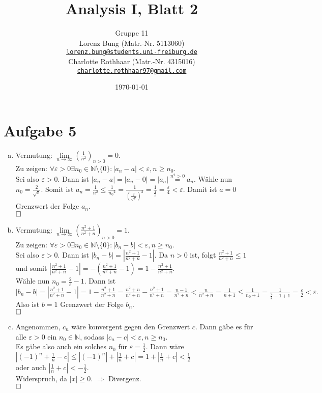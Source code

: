 \documentclass[12pt,a4paper]{article}
\title{Analysis I, Blatt 2}
\author{
    Gruppe 11\\
    Lorenz Bung (Matr.-Nr. 5113060)\\
    \href{mailto:lorenz.bung@students.uni-freiburg.de}{\texttt{lorenz.bung@students.uni-freiburg.de}}\\
    Charlotte Rothhaar (Matr.-Nr. 4315016)\\
    \href{mailto:charlotte.rothhaar97@gmail.com}{\texttt{charlotte.rothhaar97@gmail.com}}
}
\date{\today}
\newcommand{\qed}{\null\nobreak\hfill\square}
\begin{document}
\maketitle


\section*{Aufgabe 5}

\begin{enumerate}[(a)]
    \item Vermutung: $\lim\limits_{n \to \infty} \left(\frac{1}{n^2}\right)_{n > 0} = 0.$\\
    Zu zeigen: $\forall \varepsilon > 0 \exists n_0 \in \mathbb{N} \setminus \{0\} : |a_n - a| < \varepsilon, n \geq n_0.$\\
    Sei also $\varepsilon > 0.$
    Dann ist $|a_n - a| = |a_n - 0| = |a_n| \overset{n^2 > 0}{=} a_n.$
    Wähle nun $n_0 = \frac{2}{\sqrt{\varepsilon}}.$
    Somit ist $a_n = \frac{1}{n^2} \leq \frac{1}{{n_0}^2} = \frac{1}{(\frac{2}{\sqrt{\varepsilon}})^2} = \frac{1}{\frac{4}{\varepsilon}} = \frac{\varepsilon}{4} < \varepsilon.$
    Damit ist $a = 0$ Grenzwert der Folge $a_n$.\\
    $\qed$

    \item Vermutung: $\lim\limits_{n \to \infty} \left(\frac{n^2+1}{n^2+n}\right)_{n>0} = 1.$\\
    Zu zeigen: $\forall \varepsilon > 0 \exists n_0 \in \mathbb{N} \setminus \{0\} : |b_n - b| < \varepsilon, n \geq n_0.$\\
    Sei also $\varepsilon > 0.$
    Dann ist $|b_n - b| = |\frac{n^2+1}{n^2+n} -1|.$
    Da $n > 0$ ist, folgt $\frac{n^2+1}{n^2+n} \leq 1$ und somit $|\frac{n^2+1}{n^2+n} -1| = -(\frac{n^2+1}{n^2+n}-1) = 1-\frac{n^2+1}{n^2+n}.$\\
    Wähle nun $n_0 = \frac{2}{\varepsilon}-1.$ Dann ist\\
    $|b_n -b| = |\frac{n^2+1}{n^2+n}-1| = 1 - \frac{n^2+1}{n^2+n} = \frac{n^2+n}{n^2+n} - \frac{n^2+1}{n^2+n} = \frac{n-1}{n^2+n} < \frac{n}{n^2+n} = \frac{1}{n+1} \leq \frac{1}{n_0+1} = \frac{1}{\frac{2}{\varepsilon}-1+1} = \frac{\varepsilon}{2} < \varepsilon.$\\
    Also ist $b = 1$ Grenzwert der Folge $b_n$.\\
    $\qed$

    \item Angenommen, $c_n$ wäre konvergent gegen den Grenzwert $c.$
    Dann gäbe es für alle $\varepsilon > 0$ ein $n_0 \in \mathbb{N}$, sodass $|c_n - c| < \varepsilon, n \geq n_0.$\\
    Es gäbe also auch ein solches $n_0$ für $\varepsilon = \frac{1}{2}.$
    Dann wäre\\
    $|(-1)^n + \frac{1}{n} - c| \leq |(-1)^n| + |\frac{1}{n} + c| = 1 + |\frac{1}{n} + c| < \frac{1}{2}$\\
    oder auch $|\frac{1}{n} + c| < -\frac{1}{2}.$\\
    Widerspruch, da $|x| \geq 0.$ $\Rightarrow$ Divergenz.\\
    $\qed$
\end{enumerate}
\end{document}
